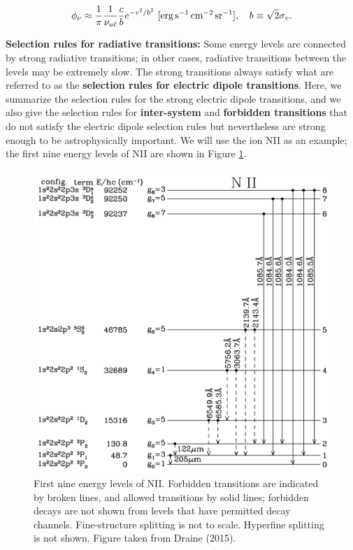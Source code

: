 \documentclass[a4paper,10pt]{article}
\begin{document}
\begin{align*}
    \phi_\nu \approx \frac{1}{\pi} \frac{1}{\nu_{u\ell}}\frac{c}{b} e^{-v^2/b^2} ~ [{\rm erg\,s^{-1}\,cm^{-2}\,sr^{-1}}], ~~~ b\equiv\sqrt{2}\sigma_v.
\end{align*}

{\noindent}\textbf{Selection rules for radiative transitions:} Some energy levels are connected by strong radiative transitions; in other cases, radiative transitions between the levels may be extremely slow. The strong transitions always satisfy what are referred to as the \textbf{selection rules for electric dipole transitions}. Here, we summarize the selection rules for the strong electric dipole transitions, and we also give the selection rules for \textbf{inter-system} and \textbf{forbidden transitions} that do not satisfy the electric dipole selection rules but nevertheless are strong enough to be astrophysically important. We will use the ion NII as an example; the first nine energy levels of NII are shown in Figure \ref{fig:NIIlevels}.

\begin{figure}[t]
    \centering
    \includegraphics[width=12cm]{figures/NII_levels.png}
    \caption{\footnotesize{First nine energy levels of NII. Forbidden transitions are indicated by broken lines, and allowed transitions by solid lines; forbidden decays are not shown from levels that have permitted decay channels. Fine-structure splitting is not to scale. Hyperfine splitting is not shown. Figure taken from Draine (2015).}}
    \label{fig:NIIlevels}
\end{figure}
\end{document}

